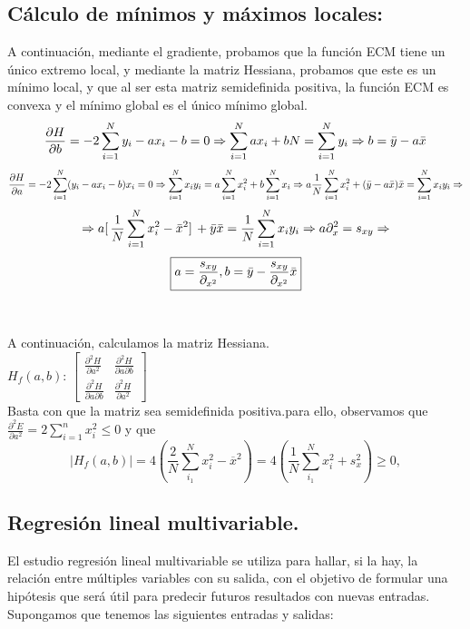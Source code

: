 \documentclass[a4paper,10pt]{article}
\begin{document}
\subsection{Cálculo de mínimos y máximos locales:}
A continuación, mediante el gradiente, probamos que la función ECM tiene
un único extremo local, y mediante la matriz Hessiana, probamos que este es un
mínimo local, y que al ser esta matriz semidefinida positiva, la función ECM es
convexa y el mínimo global es el único mínimo global.
\[\frac{\partial{H}}{\partial{b}}=-2\sum_{i=1}^{N}y_{i}-ax_{i}-b=0\Rightarrow \sum_{i=1}^{N}ax_{i}+bN=\sum_{i=1}^{N}y_{i}\Rightarrow b=\Bar{y}-a\Bar{x}\]
\[\frac{\partial{H}}{\partial{a}}=-2\sum_{i=1}^{N}(y_{i}-ax_{i}-b)x_{i}=0\Rightarrow \sum_{i=1}^{N}x_{i}y_{i}=a\sum_{i=1}^{N}x_{i}^2+b\sum_{i=1}^{N}x_{i}\Rightarrow a \frac{1}{N}\sum_{i=1}^{N}x_{i}^2+(\Bar{y}-a\Bar{x})\Bar{x}=\sum_{i=1}^{N}x_{i}y_{i}\Rightarrow\] 
\[\Rightarrow a[ \,\frac{1}{N} \sum_{i=1}^{N} x_{i}^2-\Bar{x}^2] \,+\Bar{y}\Bar{x}=\frac{1}{N}\sum_{i=1}^{N}x_{i}y_{i}\Rightarrow a\partial_x^2=s_{xy}\Rightarrow\]
\[\boxed{a=\frac{s_{xy}}{\partial_{x^2}}, b=\Bar{y}-\frac{s_{xy}}{\partial_{x^2}}\Bar{x}}\]
\\
\\A continuación, calculamos la matriz Hessiana.\\
$H_f(a,b)$: $
\begin{bmatrix}
    \frac{\partial^2 H}{\partial a^2} & \frac{\partial^2 H}{\partial a \partial b} \\
    \frac{\partial^2 H}{\partial a \partial b} & \frac{\partial^2 H}{\partial a^2}
\end{bmatrix} $\\
Basta con que la matriz sea semidefinida positiva.para ello, observamos que $\frac{\partial^2 E}{\partial a^2}= 2 \sum_{i=1}^n x_{i}^2\leq 0$ y que
$$
|H_f(a,b)|=4\left(\frac{2}{N}\sum_{i_1}^N x_i^2-\overline{x}^2\right)=4\left(\frac{1}{N}\sum_{i_1}^N x_i^2+s_x^2\right)\geq 0,
$$
\subsection{Regresión lineal multivariable.}

El estudio regresión lineal multivariable se utiliza para hallar, si la hay, la relación entre múltiples variables con su salida, con el objetivo de formular una hipótesis que será útil para predecir futuros resultados con nuevas entradas. \\
Supongamos que tenemos las siguientes entradas y salidas: 
\end{document}
